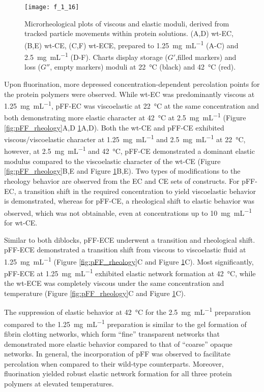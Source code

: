 \begin{refsection}
\begin{figure}[h!] \centering \texttt{[image: f\_1\_16]}
    \caption{Microrheological plots of viscous and elastic moduli, derived from
    tracked particle movements within protein solutions. (A,D) wt-EC, (B,E)
    wt-CE, (C,F) wt-ECE, prepared to \SI{1.25}{\mg\per\mL} (A-C) and
    \SI{2.5}{\mg\per\mL} (D-F). Charts display storage (${G'}$,filled markers) and loss
    (${G''}$, empty markers) moduli at \SI{22}{\celsius} (black) and \SI{42}{\celsius}
(red).} \label{fig:wt_rheology} \end{figure}
Upon fluorination, more depressed concentration-dependent percolation points for
the protein polymers were observed. While wt-EC was predominantly viscous at
\SI{1.25}{\mg\per\mL}, pFF-EC was viscoelastic at \SI{22}{\celsius} at the same
concentration and both demonstrating more elastic character at \SI{42}{\celsius}
at \SI{2.5}{\mg\per\mL} (Figure \ref{fig:pFF_rheology}A,D
\ref{fig:wt_rheology}A,D). Both the wt-CE and pFF-CE exhibited
viscous/viscoelastic character at \SI{1.25}{\mg\per\mL} and \SI{2.5}{\mg\per\mL}
at \SI{22}{\celsius}, however, at \SI{2.5}{\mg\per\mL} and \SI{42}{\celsius},
pFF-CE demonstrated a dominant elastic modulus compared to the viscoelastic
character of the wt-CE (Figure \ref{fig:pFF_rheology}B,E and Figure
\ref{fig:wt_rheology}B,E). Two types of modifications to the rheology behavior
are observed from the EC and CE sets of constructs. For pFF-EC, a transition
shift in the required concentration to yield viscoelastic behavior is
demonstrated, whereas for pFF-CE, a rheological shift to elastic behavior was
observed, which was not obtainable, even at concentrations up to
\SI{10}{\mg\per\mL} for wt-CE.\cite{Haghpanah2010}

Similar to both diblocks, pFF-ECE underwent a transition and rheological shift.
pFF-ECE demonstrated a transition shift from viscous to viscoelastic fluid at
\SI{1.25}{\mg\per\mL} (Figure \ref{fig:pFF_rheology}C and Figure
\ref{fig:wt_rheology}C). Most significantly, pFF-ECE at
\SI{1.25}{\mg\per\mL} exhibited elastic network formation at
\SI{42}{\celsius}, while the wt-ECE was completely viscous under the same
concentration and temperature (Figure \ref{fig:pFF_rheology}C and Figure
\ref{fig:wt_rheology}C).

The suppression of elastic behavior at \SI{42}{\celsius} for the
\SI{2.5}{\mg\per\mL} preparation compared to the \SI{1.25}{\mg\per\mL}
preparation is similar to the gel formation of fibrin clotting networks, which
form ``fine'' transparent networks that demonstrated more elastic behavior
compared to that of ``coarse'' opaque networks.\cite{Clark1987} In general, the
incorporation of pFF was observed to facilitate percolation when compared to
their wild-type counterparts. Moreover, fluorination yielded robust elastic
network formation for all three protein polymers at elevated temperatures. 


\end{refsection}
